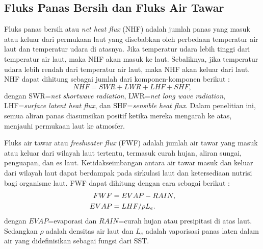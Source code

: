 \begin{spacing}{1.5}
	\subsection[Fluks Panas Bersih dan Fluks Air Tawar]{Fluks Panas Bersih dan Fluks Air Tawar}
	
	Fluks panas bersih atau \textit{net heat flux} (NHF) adalah jumlah panas yang masuk atau keluar dari permukaan laut yang disebabkan oleh perbedaan temperatur air laut dan temperatur udara di atasnya. Jika temperatur udara lebih tinggi dari temperatur air laut, maka NHF akan masuk ke laut. Sebaliknya, jika temperatur udara lebih rendah dari temperatur air laut, maka NHF akan keluar dari laut. NHF dapat dihitung sebagai jumlah dari komponen-komponen berikut \cite{Tomita2021}: 
	\begin{equation}\label{eq:NHF}
		NHF = SWR + LWR + LHF + SHF,
	\end{equation} 
	dengan SWR=\textit{net shortwave radiation}, LWR=\textit{net long wave radiation}, LHF=\textit{surface latent heat flux}, dan SHF=\textit{sensible heat flux}. Dalam penelitian ini, semua aliran panas diasumsikan positif ketika mereka mengarah ke atas, menjauhi permukaan laut ke atmosfer.
	
	Fluks air tawar atau \textit{freshwater flux} (FWF) adalah jumlah air tawar yang masuk atau keluar dari wilayah laut tertentu, termasuk curah hujan, aliran sungai, penguapan, dan es laut. Ketidakseimbangan antara air tawar masuk dan keluar dari wilayah laut dapat berdampak pada sirkulasi laut dan ketersediaan nutrisi bagi organisme laut. FWF dapat dihitung dengan cara sebagai berikut \cite{Tomita2019}:
	\begin{equation}\label{eq:FWF}\\
		\begin{aligned}
		FWF &= EVAP-RAIN, \\
		EVAP &= LHF/{\rho L_e}.
		\end{aligned}
	\end{equation} 
	dengan $EVAP$=evaporasi dan $RAIN$=curah hujan atau presipitasi di atas laut. Sedangkan $\rho$ adalah densitas air laut dan $L_e$ adalah  vaporisasi panas laten dalam air yang didefinisikan sebagai fungsi dari SST.
	

\end{spacing}
